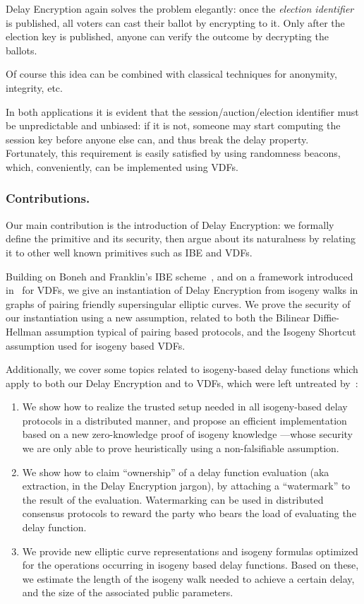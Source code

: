 \documentclass{llncs}
\begin{document}
Delay Encryption again solves the problem elegantly: once the
\emph{election identifier} is published, all voters can cast their ballot by
encrypting to it. %
Only after the election key is published, anyone can verify the
outcome by decrypting the ballots. %

Of course this idea can be combined with classical techniques for
anonymity, integrity, etc.

\medskip

In both applications it is evident that the session/auction/election
identifier must be unpredictable and unbiased: if it is not, someone may start
computing the session key before anyone else can, and thus break the
delay property. %
Fortunately, this requirement is easily satisfied by using randomness
beacons, which, conveniently, can be implemented using VDFs.

\subsubsection{Contributions.}
Our main contribution is the introduction of Delay Encryption: we
formally define the primitive and its security, then argue about its
naturalness by relating it to other well known primitives such as IBE
and VDFs.

Building on Boneh and Franklin's IBE
scheme~\cite{doi:10.1137/S0097539701398521}, and on a framework
introduced in~\cite{10.1007/978-3-030-34578-5_10} for VDFs, we give an
instantiation of Delay Encryption from isogeny walks in graphs of
pairing friendly supersingular elliptic curves. %
We prove the security of our instantiation using a new assumption,
related to both the Bilinear Diffie-Hellman assumption typical of
pairing based protocols, and the Isogeny Shortcut assumption used for
isogeny based VDFs.

Additionally, we cover some topics related to isogeny-based delay
functions which apply to both our Delay Encryption and to VDFs, which
were left untreated by~\cite{10.1007/978-3-030-34578-5_10}:
\begin{enumerate}
\item We show how to realize the trusted setup needed in all
  isogeny-based delay protocols in a distributed manner, and propose
  an efficient implementation based on a new zero-knowledge proof of
  isogeny knowledge ---whose security we are only able to prove
  heuristically using a non-falsifiable assumption.
\item We show how to claim ``ownership'' of a delay function
  evaluation (aka extraction, in the Delay Encryption jargon), by
  attaching a ``watermark'' to the result of the evaluation. %
  Watermarking can be used in distributed consensus protocols to
  reward the party who bears the load of evaluating the delay
  function.
\item We provide new elliptic curve representations and isogeny
  formulas optimized for the operations occurring in isogeny based
  delay functions. %
  Based on these, we estimate the length of the isogeny walk needed to
  achieve a certain delay, and the size of the associated public
  parameters.
\end{enumerate}
\end{document}
